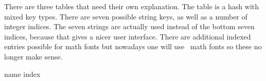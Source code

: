 {%
%
%
%

There are three tables that need their own explanation. The 
table is a hash with mixed key types. There are seven possible string keys, as
well as a number of integer indices. The seven strings are actually used instead
of the bottom seven indices, because that gives a nicer user interface. There are
additional indexed entries possible for math fonts but nowadays one will use
\OPENTYPE\ math fonts so these no longer make sense.


\starttabulate[|l|c|]
\FL
\BC name                 \BC index \NC \NR
\ML
\NC {}         \NC \NR
\NC {}         \NC \NR
\NC {}  \NC \NR
\NC {}   \NC \NR
\NC {}       \NC \NR
\NC {}          \NC \NR
\NC {}    \NC \NR
\LL
\stoptabulate

}
